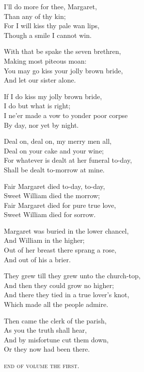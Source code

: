 \begin{dcverse}
\begin{altverse}
I'll do more for thee, Margaret,\\
Than any of thy kin;\\
For I will kiss thy pale wan lips,\\
Though a smile I cannot win.
\end{altverse}

\begin{altverse}
With that be spake the seven brethren,\\
Making most piteous moan:\\
You may go kiss your jolly brown bride,\\
And let our sister alone.
\end{altverse}

\begin{altverse}
If I do kiss my jolly brown bride,\\
I do but what is right;\\
I ne’er made a vow to yonder poor corpse\\
By day, nor yet by night.
\end{altverse}

\begin{altverse}
Deal on, deal on, my merry men all,\\
Deal on your cake and your wine;\\
For whatever is dealt at her funeral to-day,\\
Shall be dealt to-morrow at mine.
\end{altverse}

\begin{altverse}
Fair Margaret died to-day, to-day,\\
Sweet William died the morrow;\\
Fair Margaret died for pure true love,\\
Sweet William died for sorrow.
\end{altverse}

\begin{altverse}
Margaret was buried in the lower chancel,\\
And William in the higher;\\
Out of her breast there sprang a rose,\\
And out of his a brier.
\end{altverse}

\begin{altverse}
They grew till they grew unto the church-top,\\
And then they could grow no higher;\\
And there they tied in a true lover’s knot,\\
Which made all the people admire.
\end{altverse}

\begin{altverse}
Then came the clerk of the parish,\\
As you the truth shall hear,\\
And by misfortune cut them down,\\
Or they now had been there.
\end{altverse}
\end{dcverse}
\vfill
\center\textsc{end of volume the first.}
\vfill

